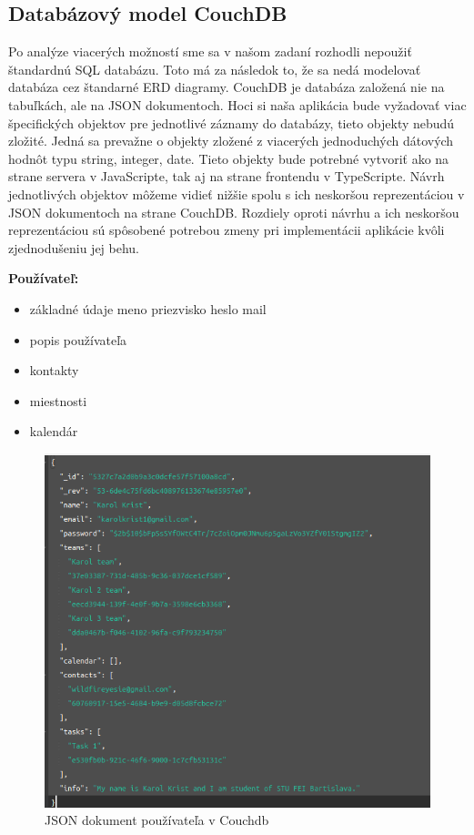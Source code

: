 \subsection{Databázový model CouchDB}
\indent Po analýze viacerých možností sme sa v našom zadaní rozhodli nepoužiť štandardnú SQL databázu. Toto má za následok to, že sa nedá modelovať databáza cez štandarné ERD diagramy. CouchDB je databáza založená nie na tabuľkách, ale na JSON dokumentoch. Hoci si naša aplikácia bude vyžadovať viac špecifických objektov pre jednotlivé záznamy do databázy, tieto objekty nebudú zložité. Jedná sa prevažne o objekty zložené z viacerých jednoduchých dátových hodnôt typu string, integer, date. Tieto objekty bude potrebné vytvoriť ako na strane servera v JavaScripte, tak aj na strane frontendu v TypeScripte. Návrh jednotlivých objektov môžeme vidieť nižšie spolu s ich neskoršou reprezentáciou v JSON dokumentoch na strane CouchDB. Rozdiely oproti návrhu a ich neskoršou reprezentáciou sú spôsobené potrebou zmeny pri implementácii aplikácie kvôli zjednodušeniu jej behu. 

\textbf{Používateľ:}
\indent\begin{itemize}
    \item základné údaje meno priezvisko heslo mail
    \item popis používateľa
    \item kontakty 
    \item miestnosti
    \item kalendár 
\end{itemize}

\begin{figure}[H]
    \centering
    \includegraphics[scale=0.50]{img/imp/db_user.png}
    \caption{JSON dokument používateľa v Couchdb}
    \label{fig:db_user}
\end{figure}

